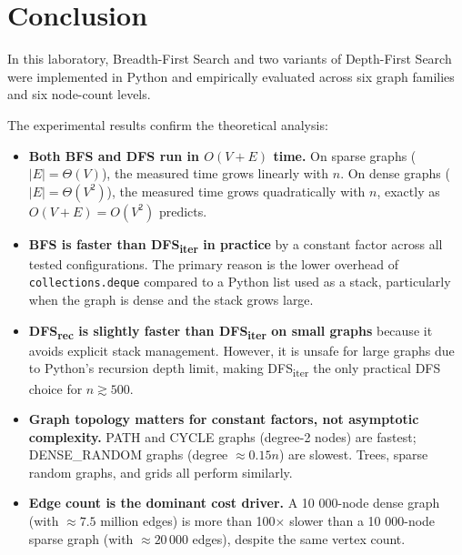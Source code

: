 
\section{Conclusion}

In this laboratory, Breadth-First Search and two variants of Depth-First Search were implemented in Python and empirically evaluated across six graph families and six node-count levels.

The experimental results confirm the theoretical analysis:

\begin{itemize}
    \item \textbf{Both BFS and DFS run in $O(V + E)$ time.} On sparse graphs ($|E| = \Theta(V)$), the measured time grows linearly with $n$. On dense graphs ($|E| = \Theta(V^2)$), the measured time grows quadratically with $n$, exactly as $O(V + E) = O(V^2)$ predicts.

    \item \textbf{BFS is faster than DFS\textsubscript{iter} in practice} by a constant factor across all tested configurations. The primary reason is the lower overhead of \texttt{collections.deque} compared to a Python list used as a stack, particularly when the graph is dense and the stack grows large.

    \item \textbf{DFS\textsubscript{rec} is slightly faster than DFS\textsubscript{iter} on small graphs} because it avoids explicit stack management. However, it is unsafe for large graphs due to Python's recursion depth limit, making DFS\textsubscript{iter} the only practical DFS choice for $n \gtrsim 500$.

    \item \textbf{Graph topology matters for constant factors, not asymptotic complexity.} PATH and CYCLE graphs (degree-2 nodes) are fastest; DENSE\_RANDOM graphs (degree $\approx 0.15n$) are slowest. Trees, sparse random graphs, and grids all perform similarly.

    \item \textbf{Edge count is the dominant cost driver.} A 10 000-node dense graph (with $\approx 7.5$ million edges) is more than 100$\times$ slower than a 10 000-node sparse graph (with $\approx 20\,000$ edges), despite the same vertex count.
\end{itemize}

